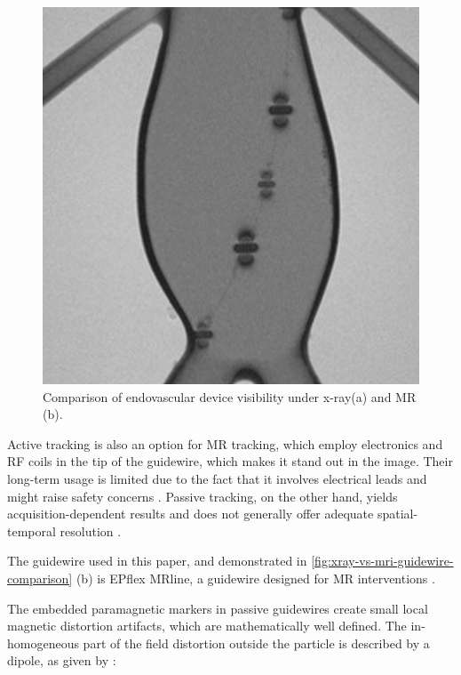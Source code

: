 \documentclass[conference]{IEEEtran}
\begin{document}
\begin{figure}[h]
\begin{minipage}{0.241\textwidth}
        \includegraphics[width=\textwidth]{Conference/img/mri-device-visibility.jpg}
    \end{minipage}\hfill \hspace*{0cm}
    \caption{Comparison of endovascular device visibility under x-ray(a) and MR (b).}
    \label{fig:xray-vs-mri-guidewire-comparison}
\end{figure}

Active tracking is also an option for MR tracking, which employ electronics and RF coils in the tip of the guidewire, which makes it stand out in the image. Their long-term usage is limited due to the fact that it involves electrical leads and might raise safety concerns \cite{pmid11146480}. Passive  tracking,  on  the  other  hand,  yields  acquisition-dependent  results  and  does  not generally  offer  adequate spatial-temporal resolution \cite{pmid11146480}.

The guidewire used in this paper, and demonstrated in \autoref{fig:xray-vs-mri-guidewire-comparison} (b) is EPflex MRline, a guidewire designed for MR interventions \cite{epflex-guidewires}.

The embedded paramagnetic markers in passive guidewires create small local magnetic distortion artifacts, which are mathematically well defined. The in-homogeneous part of the field distortion outside the particle is described by a dipole, as given by \cite{pmid14523965}:
\end{document}
